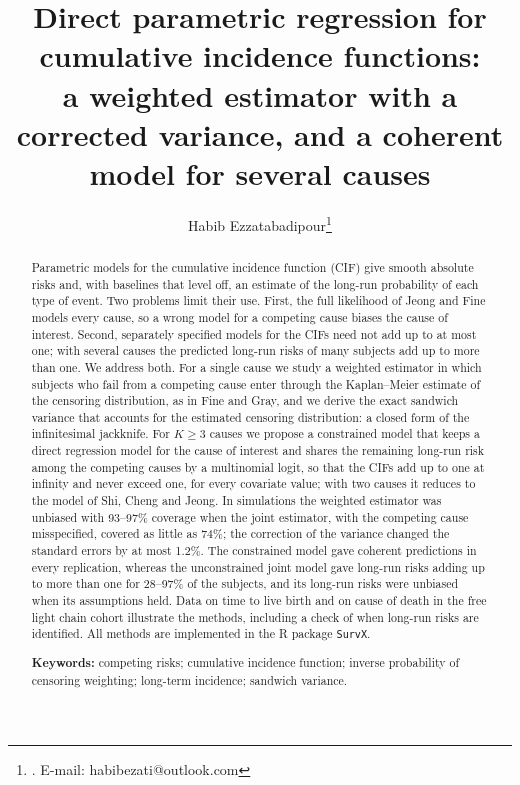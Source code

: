 \documentclass[11pt]{article}
\title{Direct parametric regression for cumulative incidence functions:\\
a weighted estimator with a corrected variance, and a coherent model for several causes}
\author{Habib Ezzatabadipour\thanks{\tbd{affiliation}. E-mail: habibezati@outlook.com}}
\date{}
\begin{document}
\maketitle

\begin{abstract}
\noindent
Parametric models for the cumulative incidence function (CIF) give smooth absolute risks and, with
baselines that level off, an estimate of the long-run probability of each type of event. Two
problems limit their use. First, the full likelihood of Jeong and Fine models every cause, so a
wrong model for a competing cause biases the cause of interest. Second, separately specified
models for the CIFs need not add up to at most one; with several causes the predicted long-run
risks of many subjects add up to more than one. We address both. For a single cause we study a
weighted estimator in which subjects who fail from a competing cause enter through the
Kaplan--Meier estimate of the censoring distribution, as in Fine and Gray, and we derive the
exact sandwich variance that accounts for the estimated censoring distribution: a closed form of
the infinitesimal jackknife. For $K \ge 3$ causes we propose a constrained model that keeps a
direct regression model for the cause of interest and shares the remaining long-run risk among the
competing causes by a multinomial logit, so that the CIFs add up to one at infinity and never
exceed one, for every covariate value; with two causes it reduces to the model of Shi, Cheng and
Jeong. In simulations the weighted estimator was unbiased with 93--97\% coverage when the joint
estimator, with the competing cause misspecified, covered as little as 74\%; the correction of
the variance changed the standard errors by at most 1.2\%. The constrained model gave coherent
predictions in every replication, whereas the unconstrained joint model gave long-run risks
adding up to more than one for 28--97\% of the subjects, and its long-run risks were unbiased
when its assumptions held. Data on time to live birth and on cause of death in the free light
chain cohort illustrate the methods, including a check of when long-run risks are identified.
All methods are implemented in the R package \texttt{SurvX}.

\medskip\noindent
\textbf{Keywords:} competing risks; cumulative incidence function; inverse probability of censoring
weighting; long-term incidence; sandwich variance.
\end{abstract}

\end{document}
